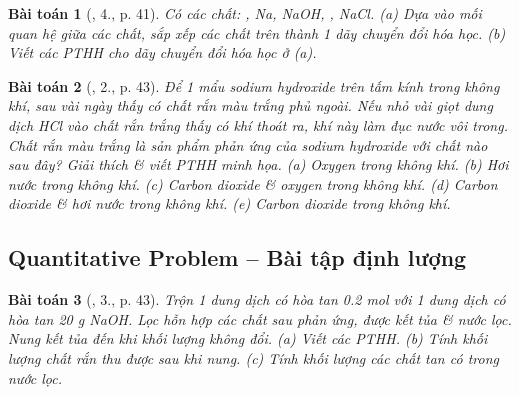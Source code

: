 \documentclass{article}
\newtheorem{baitoan}{Bài toán}
\begin{document}
\begin{baitoan}[\cite{SGK_Hoa_Hoc_9}, 4., p. 41]
	Có các chất: \emph{, Na, NaOH, , NaCl}. (a) Dựa vào mối quan hệ giữa các chất, sắp xếp các chất trên thành 1 dãy chuyển đổi hóa học. (b) Viết các PTHH cho dãy chuyển đổi hóa học ở (a).
\end{baitoan}

\begin{baitoan}[\cite{SGK_Hoa_Hoc_9}, 2., p. 43]
	Để 1 mẩu sodium hydroxide trên tấm kính trong không khí, sau vài ngày thấy có chất rắn màu trắng phủ ngoài. Nếu nhỏ vài giọt dung dịch \emph{HCl} vào chất rắn trắng thấy có khí thoát ra, khí này làm đục nước vôi trong. Chất rắn màu trắng là sản phẩm phản ứng của sodium hydroxide với chất nào sau đây? Giải thích \& viết PTHH minh họa. (a) Oxygen trong không khí. (b) Hơi nước trong không khí. (c) Carbon dioxide \& oxygen trong không khí. (d) Carbon dioxide \& hơi nước trong không khí. (e) Carbon dioxide trong không khí.
\end{baitoan}

\subsection{Quantitative Problem -- Bài tập định lượng}

\begin{baitoan}[\cite{SGK_Hoa_Hoc_9}, 3., p. 43]
	Trộn 1 dung dịch có hòa tan \emph{0.2 mol } với 1 dung dịch có hòa tan \emph{20 g NaOH}. Lọc hỗn hợp các chất sau phản ứng, được kết tủa \& nước lọc. Nung kết tủa đến khi khối lượng không đổi. (a) Viết các PTHH. (b) Tính khối lượng chất rắn thu được sau khi nung. (c) Tính khối lượng các chất tan có trong nước lọc.
\end{baitoan}


\printbibliography[heading=bibintoc]
	
\end{document}
